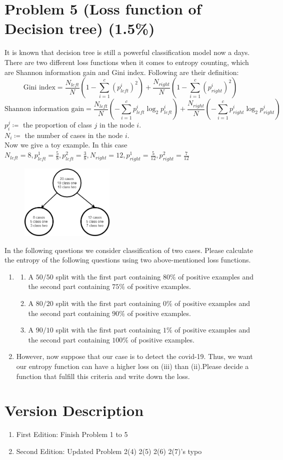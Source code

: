 \documentclass{article}
\begin{document}
\section*{Problem 5 (Loss function of Decision tree) (1.5\%)}
It is known that decision tree is still a powerful classification model now a days. There are two different loss functions when it comes to entropy counting, which are Shannon information gain and Gini index. Following are their definition:
\[
\text{Gini index} = \frac{N_{left}}{N}\left(1-\sum_{i=1}^c \left(p_{left}^i\right)^2\right) + \frac{N_{right}}{N}\left(1-\sum_{i=1}^c \left(p_{right}^i\right)^2\right)
\]
\[
\text{Shannon information gain} = \frac{N_{left}}{N}\left(-\sum_{i=1}^c p_{left}^i \log_2p_{left}^i\right) + \frac{N_{right}}{N}\left(-\sum_{i=1}^c p_{right}^i \log_2p_{right}^i\right)
\]
$p_i^j \coloneqq$ the proportion of class $j$ in the node $i$.\\
$N_i \coloneqq$ the number of cases in the node $i$.\\
Now we give a toy example. In this case $N_{left} = 8,p_{left}^1=\frac{5}{8},p_{left}^2=\frac{3}{8},N_{right}=12,p_{right}^1=\frac{5}{12},p_{right}^2=\frac{7}{12}$
\begin{figure}[h]
    \centering
    \includegraphics[width=0.4\textwidth]{ex_dt.png}
\end{figure}


In the following questions we consider classification of two cases. Please calculate the entropy of the following questions using two above-mentioned loss functions.
\begin{enumerate}[label=(\alph*)]
\item 
\begin{enumerate}[label=(\roman*)]
    \item A $50/50$ split with the first part containing $80 \%$ of positive examples and the second part containing $75 \%$ of positive examples.
    \item A $80/20$ split with the first part containing $0 \%$ of positive examples and the second part containing $90 \%$ of positive examples.
    \item A $90/10$ split with the first part containing $1 \%$ of positive examples and the second part containing $100 \%$ of positive examples.
\end{enumerate}
\item However, now suppose that our case is to detect the covid-19. Thus, we want our entropy function can have a higher loss on (iii) than (ii).Please decide a function that fulfill this criteria and write down the loss.
\end{enumerate}


 \section*{Version Description}
 \begin{enumerate}
     \item First Edition: Finish Problem 1 to 5
     \item Second Edition: Updated Problem 2(4) 2(5) 2(6) 2(7)'s typo
 \end{enumerate}
\end{document}
